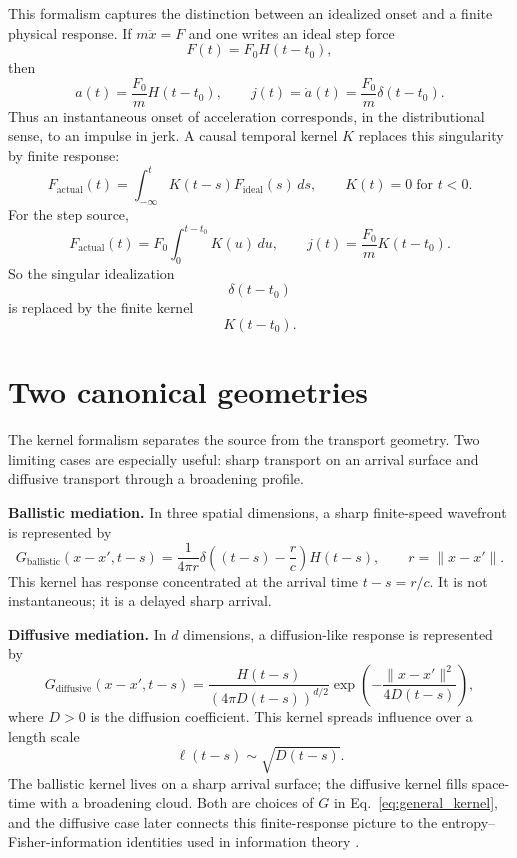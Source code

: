 \documentclass[10pt]{article}
\begin{document}
This formalism captures the distinction between an idealized onset and a finite physical response. If $m\ddot x=F$ and one writes an ideal step force
\[
F(t)=F_0H(t-t_0),
\]
then
\[
a(t)=\frac{F_0}{m}H(t-t_0),\qquad
j(t)=\dot a(t)=\frac{F_0}{m}\delta(t-t_0).
\]
Thus an instantaneous onset of acceleration corresponds, in the distributional sense, to an impulse in jerk. A causal temporal kernel $K$ replaces this singularity by finite response:
\begin{equation}\label{eq:temporal}
F_{\mathrm{actual}}(t)=\int_{-\infty}^{t}K(t-s)F_{\mathrm{ideal}}(s)\,ds,
\qquad K(t)=0\;\text{for }t<0.
\end{equation}
For the step source,
\[
F_{\mathrm{actual}}(t)=F_0\int_0^{t-t_0}K(u)\,du,
\qquad
j(t)=\frac{F_0}{m}K(t-t_0).
\]
So the singular idealization
\[
\delta(t-t_0)
\]
is replaced by the finite kernel
\[
K(t-t_0).
\]

\section{Two canonical geometries}

The kernel formalism separates the source from the transport geometry. Two limiting cases are especially useful: sharp transport on an arrival surface and diffusive transport through a broadening profile.

\textbf{Ballistic mediation.} In three spatial dimensions, a sharp finite-speed wavefront is represented by
\begin{equation}\label{eq:ballistic}
G_{\mathrm{ballistic}}(x-x',t-s)
=
\frac{1}{4\pi r}
\delta\!\left((t-s)-\frac{r}{c}\right)H(t-s),
\qquad r=\|x-x'\|.
\end{equation}
This kernel has response concentrated at the arrival time $t-s=r/c$. It is not instantaneous; it is a delayed sharp arrival.

\textbf{Diffusive mediation.} In $d$ dimensions, a diffusion-like response is represented by
\begin{equation}\label{eq:diffusive}
G_{\mathrm{diffusive}}(x-x',t-s)
=
\frac{H(t-s)}{(4\pi D(t-s))^{d/2}}
\exp\!\left(-\frac{\|x-x'\|^2}{4D(t-s)}\right),
\end{equation}
where $D>0$ is the diffusion coefficient. This kernel spreads influence over a length scale
\[
\ell(t-s)\sim \sqrt{D(t-s)}.
\]
The ballistic kernel lives on a sharp arrival surface; the diffusive kernel fills space-time with a broadening cloud. Both are choices of $G$ in Eq.~\eqref{eq:general_kernel}, and the diffusive case later connects this finite-response picture to the entropy--Fisher-information identities used in information theory \cite{dembo1991}.
\end{document}
